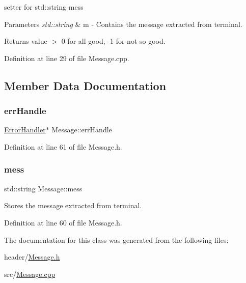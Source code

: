 setter for std\+::string mess 


\begin{DoxyParams}{Parameters}
{\em std\+::string} & m -\/ Contains the message extracted from terminal. \\
\hline
\end{DoxyParams}
\begin{DoxyReturn}{Returns}
value $>$ 0 for all good, -\/1 for not so good. 
\end{DoxyReturn}


Definition at line 29 of file Message.\+cpp.



\subsection{Member Data Documentation}
\mbox{\label{classMessage_a1052f94ece434575f0f783bc8ed3269e}} 
\subsubsection{\texorpdfstring{errHandle}{errHandle}}
{\footnotesize\ttfamily \mbox{\hyperlink{classErrorHandler}{Error\+Handler}}$\ast$ Message\+::err\+Handle\hspace{0.3cm}{\ttfamily [private]}}



Definition at line 61 of file Message.\+h.

\mbox{\label{classMessage_a71af4fd1655feab5f4986782f9c1bc92}} 
\subsubsection{\texorpdfstring{mess}{mess}}
{\footnotesize\ttfamily std\+::string Message\+::mess\hspace{0.3cm}{\ttfamily [private]}}

Stores the message extracted from terminal. 

Definition at line 60 of file Message.\+h.



The documentation for this class was generated from the following files\+:\begin{DoxyCompactItemize}
\item 
header/\mbox{\hyperlink{Message_8h}{Message.\+h}}\item 
src/\mbox{\hyperlink{Message_8cpp}{Message.\+cpp}}\end{DoxyCompactItemize}
